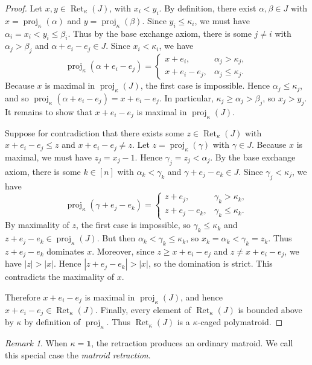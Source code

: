 \documentclass[11pt]{article}
\theoremstyle{definition}
\theoremstyle{remark}
\newtheorem{remark}[theorem]{Remark}
\newcommand{\ones}{\textbf{1}}
\DeclareMathOperator{\proj}{proj}              %
\newcommand{\kproj}{\proj_{\kappa}}            %
\DeclareMathOperator{\Ret}{Ret}                %
\newcommand{\RetK}{\Ret_{\kappa}}              %
\begin{document}
\begin{proof}
    Let $x,y \in \RetK(J)$, with $x_i < y_i$. By definition, there exist $\alpha,\beta \in J$ with $x = \kproj(\alpha)$ and $y = \kproj(\beta)$. Since $y_i \leq \kappa_i$, we must have $\alpha_i = x_i < y_i \leq \beta_i$. Thus by the base exchange axiom, there is some $j \neq i$ with $\alpha_j > \beta_j$ and $\alpha + e_i - e_j \in J$. Since $x_i < \kappa_i$, we have
    \[
        \kproj(\alpha + e_i - e_j)
        =
        \begin{cases}
            x + e_i, & \alpha_j > \kappa_j, \\
            x + e_i - e_j, & \alpha_j \leq \kappa_j.
        \end{cases}
    \]
    Because $x$ is maximal in $\kproj(J)$, the first case is impossible. Hence $\alpha_j \leq \kappa_j$, and so $\kproj(\alpha + e_i - e_j)=x+e_i-e_j$. In particular, $\kappa_j \geq \alpha_j > \beta_j$, so $x_j > y_j$. It remains to show that $x + e_i - e_j$ is maximal in $\kproj(J)$.

    Suppose for contradiction that there exists some $z \in \RetK(J)$ with $x+e_i-e_j \leq z$ and $x+e_i-e_j \neq z$. Let $z = \kproj(\gamma)$ with $\gamma \in J$. Because $x$ is maximal, we must have $z_j = x_j - 1$. Hence $\gamma_j = z_j < \alpha_j$. By the base exchange axiom, there is some $k \in [n]$ with $\alpha_k < \gamma_k$ and $\gamma + e_j - e_k \in J$. Since $\gamma_j < \kappa_j$, we have
    \[
        \kproj(\gamma + e_j - e_k)
        =
        \begin{cases}
            z + e_j, & \gamma_k > \kappa_k, \\
            z + e_j - e_k, & \gamma_k \leq \kappa_k.
        \end{cases}
    \]
    By maximality of $z$, the first case is impossible, so $\gamma_k \leq \kappa_k$ and $z+e_j-e_k \in \kproj(J)$. But then $\alpha_k < \gamma_k \leq \kappa_k$, so $x_k=\alpha_k<\gamma_k=z_k$. Thus $z+e_j-e_k$ dominates $x$. Moreover, since $z \geq x+e_i-e_j$ and $z\neq x+e_i-e_j$, we have $|z|>|x|$. Hence $|z+e_j-e_k|>|x|$, so the domination is strict. This contradicts the maximality of $x$.

    Therefore $x+e_i-e_j$ is maximal in $\kproj(J)$, and hence $x+e_i-e_j \in \RetK(J)$. Finally, every element of $\RetK(J)$ is bounded above by $\kappa$ by definition of $\kproj$. Thus $\RetK(J)$ is a $\kappa$-caged polymatroid.
\end{proof}
\begin{remark}
    When $\kappa=\ones$, the retraction produces an ordinary matroid. We call this special case the \emph{matroid retraction}.
\end{remark}
\end{document}
